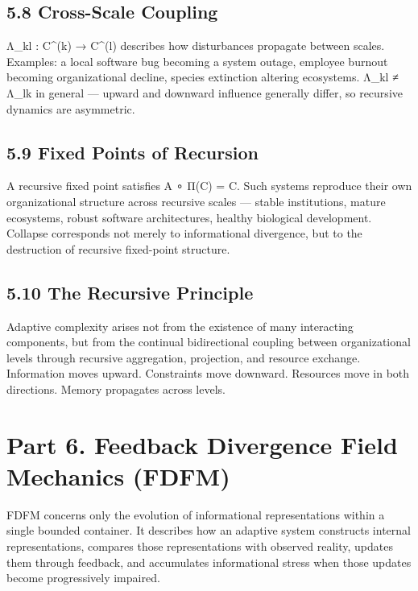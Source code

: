 \documentclass[
]{article}
\begin{document}
\hypertarget{cross-scale-coupling}{%
\subsection{5.8 Cross-Scale Coupling}\label{cross-scale-coupling}}

Λ\_kl : C\^{}(k) → C\^{}(l) describes how disturbances propagate between
scales. Examples: a local software bug becoming a system outage,
employee burnout becoming organizational decline, species extinction
altering ecosystems. Λ\_kl ≠ Λ\_lk in general --- upward and downward
influence generally differ, so recursive dynamics are asymmetric.

\hypertarget{fixed-points-of-recursion}{%
\subsection{5.9 Fixed Points of
Recursion}\label{fixed-points-of-recursion}}

A recursive fixed point satisfies A ∘ Π(C) = C. Such systems reproduce
their own organizational structure across recursive scales --- stable
institutions, mature ecosystems, robust software architectures, healthy
biological development. Collapse corresponds not merely to informational
divergence, but to the destruction of recursive fixed-point structure.

\hypertarget{the-recursive-principle}{%
\subsection{5.10 The Recursive
Principle}\label{the-recursive-principle}}

Adaptive complexity arises not from the existence of many interacting
components, but from the continual bidirectional coupling between
organizational levels through recursive aggregation, projection, and
resource exchange. Information moves upward. Constraints move downward.
Resources move in both directions. Memory propagates across levels.

\hypertarget{part-6.-feedback-divergence-field-mechanics-fdfm}{%
\section{Part 6. Feedback Divergence Field Mechanics
(FDFM)}\label{part-6.-feedback-divergence-field-mechanics-fdfm}}

FDFM concerns only the evolution of informational representations within
a single bounded container. It describes how an adaptive system
constructs internal representations, compares those representations with
observed reality, updates them through feedback, and accumulates
informational stress when those updates become progressively impaired.
\end{document}
